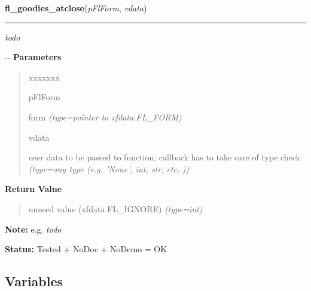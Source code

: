 \hspace{.8\funcindent}\begin{boxedminipage}{\funcwidth}

    \raggedright \textbf{fl\_goodies\_atclose}(\textit{pFlForm}, \textit{vdata})

    \vspace{-1.5ex}

    \rule{\textwidth}{0.5\fboxrule}
\setlength{\parskip}{2ex}

\emph{todo}

-{}-
\setlength{\parskip}{1ex}
      \textbf{Parameters}
      \vspace{-1ex}

      \begin{quote}
        \begin{Ventry}{xxxxxxx}

          \item[pFlForm]


form
            {\it (type=pointer to xfdata.FL\_FORM)}

          \item[vdata]


user data to be passed to function; callback has to take care of
type check
            {\it (type=any type (e.g. 'None', int, str, etc..))}

        \end{Ventry}

      \end{quote}

      \textbf{Return Value}
    \vspace{-1ex}

      \begin{quote}

unused value (xfdata.FL\_IGNORE)
      {\it (type=int)}

      \end{quote}

\textbf{Note:} 
e.g. \emph{todo}


\textbf{Status:} 
Tested + NoDoc + NoDemo = OK


    \end{boxedminipage}



  \subsection{Variables}

